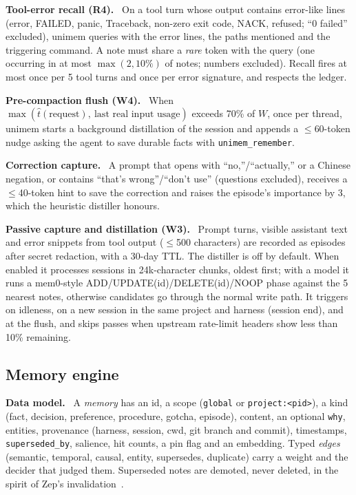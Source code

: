 \documentclass[10pt,twocolumn]{article}
\newcommand{\sys}{\textsf{unimem}}
\newcommand{\code}[1]{\texttt{\small #1}}
\newcommand{\para}[1]{\smallskip\noindent\textbf{#1}\ }
\begin{document}
\para{Tool-error recall (R4).} On a tool turn whose output contains error-like lines (error, FAILED, panic,
Traceback, non-zero exit code, NACK, refused; ``0 failed'' excluded), \sys{} queries with the error lines, the paths
mentioned and the triggering command. A note must share a \emph{rare} token with the query (one occurring in at most
$\max(2, 10\%)$ of notes; numbers excluded). Recall fires at most once per 5 tool turns and once per error signature,
and respects the ledger.

\para{Pre-compaction flush (W4).} When $\max(\hat t(\text{request}),\ \text{last real input usage})$ exceeds 70\% of $W$,
once per thread, \sys{} starts a background distillation of the session and appends a $\le$60-token nudge asking the agent
to save durable facts with \code{unimem\_remember}.

\para{Correction capture.} A prompt that opens with ``no,''/``actually,'' or a Chinese
negation, or contains ``that's wrong''/``don't use'' (questions excluded), receives a $\le$40-token hint to save the
correction and raises the episode's importance by 3, which the heuristic distiller honours.

\para{Passive capture and distillation (W3).} Prompt turns, visible assistant text and error snippets from tool
output ($\le$500 characters) are recorded as episodes after secret redaction, with a 30-day TTL. The distiller is off by
default. When enabled it processes sessions in 24k-character chunks, oldest first; with a model it runs a mem0-style
ADD/UPDATE(id)/DELETE(id)/NOOP phase against the 5 nearest notes, otherwise candidates go through the normal write
path. It triggers on idleness, on a new session in the same project and harness (session end), and at the flush, and
skips passes when upstream rate-limit headers show less than 10\% remaining.

\subsection{Memory engine}
\label{sec:engine}

\para{Data model.} A \emph{memory} has an id, a scope (\code{global} or \code{project:<pid>}), a kind (fact, decision,
preference, procedure, gotcha, episode), content, an optional \code{why}, entities, provenance (harness, session,
cwd, git branch and commit), timestamps, \code{superseded\_by}, salience, hit counts, a pin flag and an embedding.
Typed \emph{edges} (semantic, temporal, causal, entity, supersedes, duplicate) carry a weight and the decider that
judged them. Superseded notes are demoted, never deleted, in the spirit of Zep's invalidation~\cite{zep}.
\end{document}
